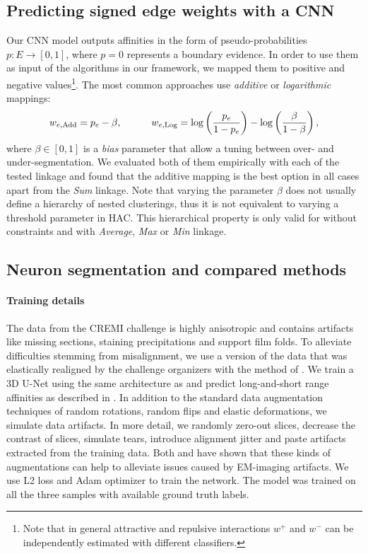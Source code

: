 \subsection{Predicting signed edge weights with a CNN}
Our CNN model outputs affinities in the form of pseudo-probabilities $p:E \rightarrow [0,1]$, where $p=0$ represents a boundary evidence. In order to use them as input of the algorithms in our framework, we mapped them to positive and negative values\footnote{Note that in general attractive and repulsive interactions $w^+$ and $w^-$ can be independently estimated with different classifiers.}. The most common approaches use \emph{additive} \cite{ailon2008aggregating} or \emph{logarithmic} \cite{finkel2008enforcing,andres2012globally} mappings:
\begin{equation} \label{eq:mappings}
w_{e,\mathrm{Add}} = p_e - \beta, \qquad \quad w_{e,\mathrm{Log}} = \log \left( \frac{p_e}{1-p_e} \right) - \log \left( \frac{\beta}{1-\beta} \right),
\end{equation}
where $\beta \in [0,1]$ is a \emph{bias} parameter that allow a tuning between over- and under-segmentation. We evaluated both of them empirically with each of the tested linkage and found that the additive mapping is the best option in all cases apart from the \emph{Sum} linkage. Note that varying the parameter $\beta$ does not usually define a hierarchy of nested clusterings, thus it is not equivalent to varying a threshold parameter in HAC. This hierarchical property is only valid for \algname{} without constraints and with \emph{Average}, \emph{Max} or \emph{Min} linkage.

\subsection{Neuron segmentation and compared methods}\label{sec:cremi_details}
\paragraph{Training details} The data from the CREMI challenge is highly anisotropic and contains artifacts like missing sections, staining precipitations and support film folds. 
To alleviate difficulties stemming from misalignment, we use a version of the data that was elastically realigned by the challenge organizers with the method of \cite{saalfeld2012elastic}.
We train a 3D U-Net \cite{ronneberger2015u, cciccek20163d} using the same architecture as \cite{funke2018large} and predict long-and-short range affinities 
as described in \cite{lee2017superhuman}. In addition to the standard data augmentation techniques of random rotations, random flips and  elastic deformations, we simulate data artifacts.
In more detail, we randomly zero-out slices, decrease the contrast of slices, simulate tears, introduce alignment jitter and paste artifacts extracted from the training data. Both \cite{funke2018large} and \cite{lee2017superhuman} have shown
that these kinds of augmentations can help to alleviate issues caused by EM-imaging artifacts.
We use L2 loss and Adam optimizer to train the network. The model was trained on all the three samples with available ground truth labels.  

